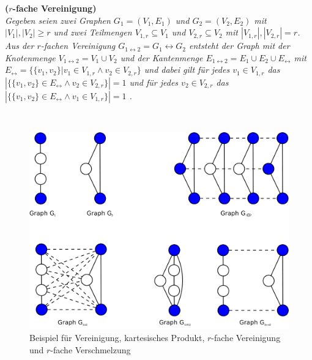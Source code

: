 \begin{defi}{\textbf{($r$-fache Vereinigung)}}\\
\emph{Gegeben seien zwei Graphen $G_1=(V_1,E_1)$ und $G_2=(V_2,E_2)$ mit $|V_1|, |V_2| \geq r$ und zwei Teilmengen $V_{1,r} \subseteq V_1$ und $V_{2,r} \subseteq V_2$ mit $|V_{1,r}|, |V_{2,r}| = r$. 
Aus der $r$-fachen Vereinigung $G_{1 \leftrightarrow 2}= G_1 \leftrightarrow G_2$ entsteht der Graph mit der Knotenmenge $V_{1 \leftrightarrow 2}=V_1 \cup V_2$ und der Kantenmenge $E_{1\leftrightarrow 2}= E_1 \cup E_2 \cup E_{\leftrightarrow }$ mit $E_{\leftrightarrow}=\{\{v_1,v_2\}| v_1 \in V_{1,r} \wedge v_2 \in V_{2,r} \}$ und dabei gilt für jedes $v_1 \in V_{1,r}$ das $|\{\{v_1,v_2\} \in E_{\leftrightarrow} \wedge  v_2 \in V_{2,r} \}|= 1$ und für jedes $v_2 \in V_{2,r}$ das $|\{\{v_1,v_2\} \in E_{\leftrightarrow} \wedge v_1 \in V_{1,r} \}|= 1$ .} 
\end{defi}
\begin{bsp} \textcolor{white}{x}
\begin{figure}[h!]
		\centering 		 
   \includegraphics[width=427pt]{bilder/struktur2.pdf}
	\caption{Beispiel für Vereinigung, kartesisches Produkt, $r$-fache Vereinigung und $r$-fache Verschmelzung}
  	 \end{figure}
\end{bsp}
\newpage
